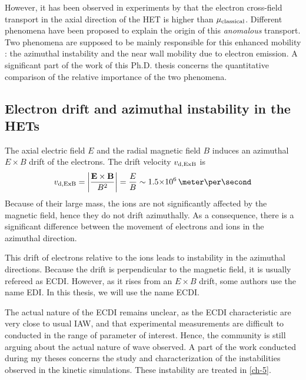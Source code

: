   
  However, it has been observed in experiments by \citet{meezan2001} that the electron cross-field transport in the axial direction of the \ac{HET} is higher than $\mu_{\mathrm{classical}}$.
  Different phenomena have been proposed to explain the origin of this \emph{anomalous} transport.
  Two phenomena are supposed to be mainly responsible for this enhanced mobility \citep{croes2017}\string: the azimuthal instability and the near wall mobility due to electron emission.
  A significant part of the work of this Ph.D. thesis concerns the quantitative comparison of the relative importance of the two phenomena.

  
  \subsection*{Electron drift and azimuthal instability in the HETs}

  The axial electric field $E$ and the radial magnetic field $B$ induces an azimuthal $E\times B$ drift of the electrons.
  The drift velocity $v_{\rm d, ExB}$ is 
  \begin{equation} \label{eq-exbdrift}
    v_{\rm d, ExB} = \bigg\lvert \frac{\vect{E} \times \vect{B}}{B^2} \bigg\rvert = \frac{E}{B} \sim \sn{1.5}{6} \,\meter\per\second
  \end{equation}
  Because of their large mass, the ions are not significantly affected by the magnetic field, hence they do not drift azimuthally.
  As a consequence, there is a significant difference between the movement of electrons and ions in the azimuthal direction.

  This drift of electrons relative to the ions leads to instability in the azimuthal directions.
  Because the drift is perpendicular to the magnetic field, it is usually refereed as \ac{ECDI}.
  However, as it rises from an $E\times B$ drift, some authors use the name \ac{EDI}.
  In this thesis, we will use the name \ac{ECDI}.

  The actual nature of the \ac{ECDI} remains unclear\citep{boeuf2018}, as the \ac{ECDI} characteristic are very close to usual \ac{IAW}, and that experimental measurements are difficult to conducted in the range of parameter of interest.
  Hence, the community is still arguing about the actual nature of wave observed.
  A part of the work conducted during my theses concerns the study and characterization of the instabilities observed in the kinetic simulations.
  These instability are treated in \cref{ch-5}.
  
